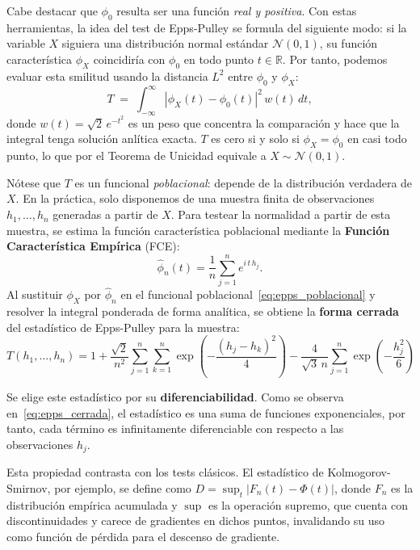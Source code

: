Cabe destacar que $\phi_0$ resulta ser una función \emph{real y positiva}. Con estas herramientas, la idea del test de Epps-Pulley se formula del siguiente modo: si la variable $X$ siguiera una distribución normal estándar $\mathcal{N}(0,1)$, su función característica $\phi_X$ coincidiría con $\phi_0$ en todo punto $t \in \mathbb{R}$. Por tanto, podemos evaluar esta smilitud usando la distancia $L^2$ entre $\phi_0$ y $\phi_X$:
\begin{equation}
T \;=\; \int_{-\infty}^{\infty} \left|\phi_X(t) - \phi_0(t)\right|^2\, w(t)\, dt,
\label{eq:epps_poblacional}
\end{equation}
donde $w(t) = \sqrt{2}\, e^{-t^2}$ es un peso que concentra la comparación y hace que la integral tenga solución anlítica exacta. $T$ es cero si y solo si $\phi_X = \phi_0$ en casi todo punto, lo que por el Teorema de Unicidad equivale a $X \sim \mathcal{N}(0,1)$.

Nótese que $T$ es un funcional \emph{poblacional}: depende de la distribución verdadera de $X$. En la práctica, solo disponemos de una muestra finita de observaciones $h_1, \dots, h_n$ generadas a partir de $X$. Para testear la normalidad a partir de esta muestra, se estima la función característica poblacional mediante la \textbf{Función Característica Empírica} (FCE):
\begin{equation}
\hat{\phi}_n(t) = \frac{1}{n} \sum_{j=1}^{n} e^{i\, t\, h_j}.
\end{equation}
Al sustituir $\phi_X$ por $\hat{\phi}_n$ en el funcional poblacional~\eqref{eq:epps_poblacional} y resolver la integral ponderada de forma analítica, se obtiene la \textbf{forma cerrada} del estadístico de Epps-Pulley para la muestra:
\begin{equation}
T(h_1, \dots, h_n) = 1 + \frac{\sqrt{2}}{n^2} \sum_{j=1}^{n} \sum_{k=1}^{n} \exp\!\left(-\frac{(h_j - h_k)^2}{4}\right) - \frac{4}{\sqrt{3}\, n} \sum_{j=1}^{n} \exp\!\left(-\frac{h_j^2}{6}\right)
\label{eq:epps_cerrada}
\end{equation}

Se elige este estadístico por su \textbf{diferenciabilidad}. Como se observa en~\eqref{eq:epps_cerrada}, el estadístico es una suma de funciones exponenciales, por tanto, cada término es infinitamente diferenciable con respecto a las observaciones $h_j$. 

Esta propiedad contrasta con los tests clásicos. El estadístico de Kolmogorov-Smirnov, por ejemplo, se define como $D = \sup_t |F_n(t) - \Phi(t)|$, donde $F_n$ es la distribución empírica acumulada y $\sup$ es la operación supremo, que cuenta con discontinuidades y carece de gradientes en dichos puntos, invalidando su uso como función de pérdida para el descenso de gradiente.

